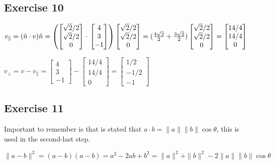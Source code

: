 \documentclass[11pt]{article}
\begin{document}
\subsection{Exercise 10}

$v_\|=(\hat{n}\cdot{}v)\hat{n}=
\left(\begin{bmatrix}
\sqrt{2}/2 \\
\sqrt{2}/2 \\
0
\end{bmatrix}\cdot{}
\begin{bmatrix}
4 \\
3 \\
-1
\end{bmatrix}
\right)
\begin{bmatrix}
\sqrt{2}/2 \\
\sqrt{2}/2 \\
0
\end{bmatrix}= \\
(\frac{4\sqrt{2}}{2}+\frac{3\sqrt{2}}{2})
\begin{bmatrix}
\sqrt{2}/2 \\
\sqrt{2}/2 \\
0
\end{bmatrix}
=
\begin{bmatrix}
14/4 \\
14/4 \\
0
\end{bmatrix}$

$v_\bot=v-v_\|=
\begin{bmatrix}
4 \\
3 \\
-1
\end{bmatrix}-
\begin{bmatrix}
14/4 \\
14/4 \\
0
\end{bmatrix}=
\begin{bmatrix}
1/2 \\
-1/2 \\
-1
\end{bmatrix}
$

\subsection{Exercise 11}

Important to remember is that is stated that $a\cdot{}b=\|a\|\|b\|\cos\theta$, this is used in the second-last step.

$\|a-b\|^2=(a-b)(a-b)=a^2-2ab+b^2=\|a\|^2+\|b\|^2-2\|a\|\|b\|\cos\theta$
\end{document}
